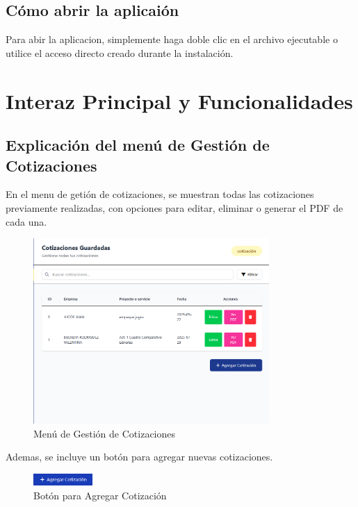 \documentclass{Pretexto/bluereport}
\begin{document}
\subsection{Cómo abrir la aplicaión}

Para abir la aplicacion, simplemente haga doble clic en el archivo ejecutable o utilice el acceso directo creado durante la instalación.
\pagebreak
\section{Interaz Principal y Funcionalidades}
\subsection{Explicación del menú de Gestión de Cotizaciones}

En el menu de getión de cotizaciones, se muestran todas las cotizaciones previamente realizadas, con opciones para editar,
 eliminar o generar el PDF de cada una.

\begin{figure}[H]
    \centering
    \includegraphics[width=0.8\textwidth]{img/gestion_cotizaciones.png}
    \caption{Menú de Gestión de Cotizaciones}
    \label{fig:gestion_cotizaciones}
\end{figure}

Ademas, se incluye un botón para agregar nuevas cotizaciones.

\begin{figure}[H]
    \centering
    \includegraphics[width=0.2\textwidth]{img/agregar_cotizacion.png}
    \caption{Botón para Agregar Cotización}
    \label{fig:agregar_cotizacion}
\end{figure}
\end{document}
